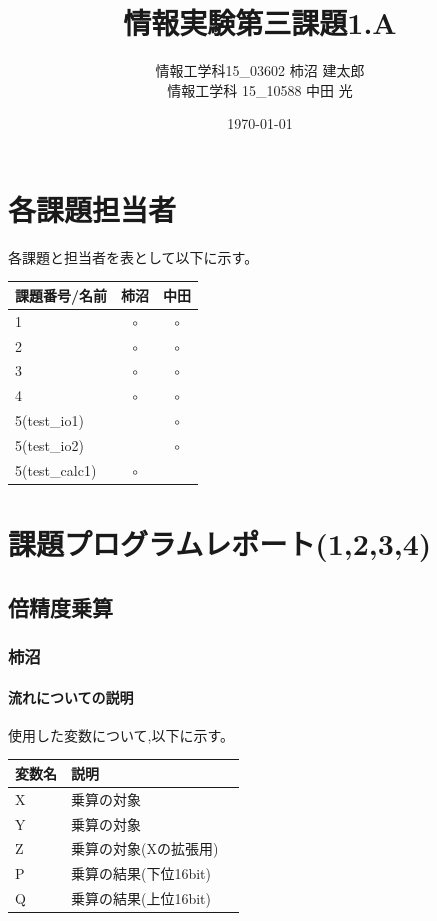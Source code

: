 \documentclass[dvipdfmx,12pt]{jreport}
\title{ 情報実験第三課題1.A}
\author{情報工学科15\_03602 柿沼 建太郎 \\ 情報工学科 15\_10588 中田 光}
\date{\today}
\begin{document}
\maketitle

\chapter*{各課題担当者}
各課題と担当者を表として以下に示す。
\begin{table}[h]
  \begin{tabular}{|l|c|c|} \hline
    課題番号/名前 & 柿沼 & 中田 \\ \hline \hline
    1 & $\circ$ & $\circ$ \\ \hline
    2 & $\circ$ & $\circ$ \\ \hline
    3 & $\circ$ & $\circ$ \\ \hline
    4 & $\circ$ & $\circ$ \\ \hline
    5(test\_io1) &  & $\circ$ \\ \hline
    5(test\_io2) &  & $\circ$ \\ \hline
    5(test\_calc1) & $\circ$ &  \\ \hline
  \end{tabular}
\end{table}

\chapter*{課題プログラムレポート(1,2,3,4)}

\section*{倍精度乗算}
\subsection*{柿沼}
\subsubsection*{流れについての説明}
使用した変数について,以下に示す。
\begin{table}[h]
  \begin{tabular}{|l|l|l|} \hline
    変数名 & 説明 \\ \hline
    X & 乗算の対象 \\ \hline
    Y & 乗算の対象 \\ \hline
    Z & 乗算の対象(Xの拡張用) \\ \hline
    P & 乗算の結果(下位16bit) \\ \hline
    Q & 乗算の結果(上位16bit) \\ \hline
  \end{tabular}
\end{table}
\end{document}
